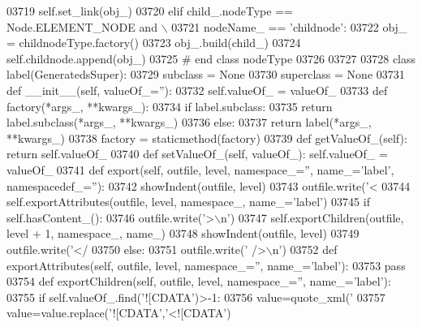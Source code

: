 \begin{DoxyCode}
{{{{{{{{{{{{{{{{{{{{{{{{{{{{{{{{{{{{{{{{{{{{{{{{{{{{{{{{{{{{{{{{{{{{{{{{{{{{{{{{{{{{{{{{{{{{{{{{{{{{{{{{{{{{{{{{{{{{{{{{{{{{{{{{{{{{{{{{{{{{{{{{{{{{{{{{{{{{{{{{{{{{{{{{{{{{{{{{{{{{{{{{{{{{{{{{{{{{{{{{{{{{{{{{{{{{{{{{{{{{{{{{{{{{{{{{{{{{{{03719             self.set_link(obj\_)
03720         \textcolor{keywordflow}{elif} child\_.nodeType == Node.ELEMENT\_NODE \textcolor{keywordflow}{and} \(\backslash\)
03721             nodeName\_ == \textcolor{stringliteral}{'childnode'}:
03722             obj\_ = childnodeType.factory()
03723             obj\_.build(child\_)
03724             self.childnode.append(obj\_)
03725 \textcolor{comment}{# end class nodeType}
03726 
03727 
03728 \textcolor{keyword}{class }label(GeneratedsSuper):
03729     subclass = \textcolor{keywordtype}{None}
03730     superclass = \textcolor{keywordtype}{None}
03731     \textcolor{keyword}{def }__init__(self, valueOf\_=''):
03732         self.valueOf_ = valueOf\_
03733     \textcolor{keyword}{def }factory(*args\_, **kwargs\_):
03734         \textcolor{keywordflow}{if} label.subclass:
03735             \textcolor{keywordflow}{return} label.subclass(*args\_, **kwargs\_)
03736         \textcolor{keywordflow}{else}:
03737             \textcolor{keywordflow}{return} label(*args\_, **kwargs\_)
03738     factory = staticmethod(factory)
03739     \textcolor{keyword}{def }getValueOf_(self): \textcolor{keywordflow}{return} self.valueOf\_
03740     \textcolor{keyword}{def }setValueOf_(self, valueOf\_): self.valueOf\_ = valueOf\_
03741     \textcolor{keyword}{def }export(self, outfile, level, namespace\_='', name\_='label', namespacedef\_=''):
03742         showIndent(outfile, level)
03743         outfile.write(\textcolor{stringliteral}{'<%
03744         self.exportAttributes(outfile, level, namespace\_, name\_=\textcolor{stringliteral}{'label'})
03745         \textcolor{keywordflow}{if} self.hasContent_():
03746             outfile.write(\textcolor{stringliteral}{'>\(\backslash\)n'})
03747             self.exportChildren(outfile, level + 1, namespace\_, name\_)
03748             showIndent(outfile, level)
03749             outfile.write(\textcolor{stringliteral}{'</%
03750         \textcolor{keywordflow}{else}:
03751             outfile.write(\textcolor{stringliteral}{' />\(\backslash\)n'})
03752     \textcolor{keyword}{def }exportAttributes(self, outfile, level, namespace\_='', name\_='label'):
03753         \textcolor{keywordflow}{pass}
03754     \textcolor{keyword}{def }exportChildren(self, outfile, level, namespace\_='', name\_='label'):
03755         \textcolor{keywordflow}{if} self.valueOf\_.find(\textcolor{stringliteral}{'![CDATA'})>-1:
03756             value=quote_xml(\textcolor{stringliteral}{'%
03757             value=value.replace(\textcolor{stringliteral}{'![CDATA'},\textcolor{stringliteral}{'<![CDATA'})
}}}}}}}}}}}}}}}}}}}}}}}}}}}}}}}}}}}}}}}}}}}}}}}}}}}}}}}}}}}}}}}}}}}}}}}}}}}}}}}}}}}}}}}}}}}}}}}}}}}}}}}}}}}}}}}}}}}}}}}}}}}}}}}}}}}}}}}}}}}}}}}}}}}}}}}}}}}}}}}}}}}}}}}}}}}}}}}}}}}}}}}}}}}}}}}}}}}}}}}}}}}}}}}}}}}}}}}}}}}}}}}}}}}}}}}}}}}}}}}}}
\end{DoxyCode}
